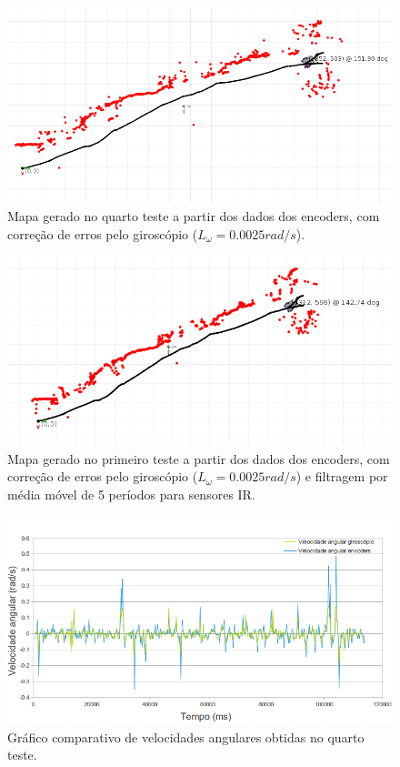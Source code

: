 \begin{figure}[H]
	\centering
	\includegraphics[width=1\textwidth]{./figuras/testes/teste4/mapa_encoders_giro.png}
	\caption{Mapa gerado no quarto teste a partir dos dados dos encoders, com correção de erros pelo giroscópio ($L_\omega = 0.0025 \unit{rad/s}$).}
	\label{fig:teste4_mapa_encoders_giro}
\end{figure}

\begin{figure}[H]
	\centering
	\includegraphics[width=1\textwidth]{./figuras/testes/teste4/mapa_encoders_giro_media4.png}
	\caption{Mapa gerado no primeiro teste a partir dos dados dos encoders, com correção de erros pelo giroscópio ($L_\omega = 0.0025 \unit{rad/s}$) e filtragem por média móvel de 5 períodos para sensores IR.}
	\label{fig:teste4_mapa_encoders_giro_media4}
\end{figure}

\begin{figure}[H]
	\centering
	\includegraphics[width=1\textwidth]{./figuras/testes/teste4/grafico_giro.png}
	\caption{Gráfico comparativo de velocidades angulares obtidas no quarto teste.}
	\label{fig:teste4_giro_grafico}
\end{figure}

